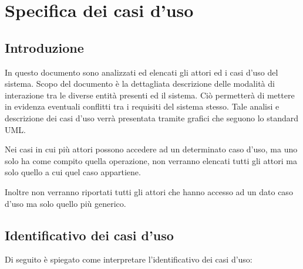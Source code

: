 \chapter{Specifica dei casi d'uso}

\section{Introduzione}
In questo documento sono analizzati ed elencati gli attori ed i casi d'uso del sistema.
Scopo del documento è la dettagliata descrizione delle modalità di interazione tra le diverse entità presenti ed il sistema.
Ciò permetterà di mettere in evidenza eventuali conflitti tra i requisiti del sistema stesso.
Tale analisi e descrizione dei casi d'uso verrà presentata tramite grafici che seguono lo standard UML.

Nei casi in cui più attori possono accedere ad un determinato caso d’uso, ma uno
solo ha come compito quella operazione, non verranno elencati tutti gli attori
ma solo quello a cui quel caso appartiene.

Inoltre non verranno riportati tutti gli attori che hanno accesso ad un dato caso d'uso ma solo quello più generico.

\section{Identificativo dei casi d'uso} %
Di seguito è spiegato come interpretare l'identificativo dei casi d'uso:
\begin{center}
\end{center}

